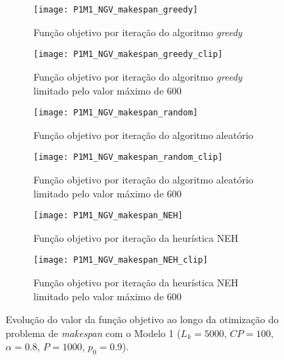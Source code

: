 \begin{figure}[H]
    \centering
    \begin{subfigure}{0.49\textwidth}
        \centering
        \texttt{[image: P1M1\_NGV\_makespan\_greedy]}
        \caption{Função objetivo por iteração do algoritmo \textit{greedy}}
        \label{fig:P1M1_NGV_makespan_greedy}
    \end{subfigure}
    \hfill
    \begin{subfigure}{0.49\textwidth}
        \centering
        \texttt{[image: P1M1\_NGV\_makespan\_greedy\_clip]}
        \caption{Função objetivo por iteração do algoritmo \textit{greedy} limitado pelo valor máximo de 600}
        \label{fig:P1M1_NGV_makespan_greedy_clip}
    \end{subfigure}
    
    \begin{subfigure}{0.49\textwidth}
        \centering
        \texttt{[image: P1M1\_NGV\_makespan\_random]}
        \caption{Função objetivo por iteração do algoritmo aleatório}
        \label{fig:P1M1_NGV_makespan_random}
    \end{subfigure}
    \hfill
    \begin{subfigure}{0.49\textwidth}
        \centering
        \texttt{[image: P1M1\_NGV\_makespan\_random\_clip]}
        \caption{Função objetivo por iteração do algoritmo aleatório limitado pelo valor máximo de 600}
        \label{fig:P1M1_NGV_makespan_random_clip}
    \end{subfigure}
    
    \begin{subfigure}{0.49\textwidth}
        \centering
        \texttt{[image: P1M1\_NGV\_makespan\_NEH]}
        \caption{Função objetivo por iteração da heurística NEH}
        \label{fig:P1M1_NGV_makespan_NEH}
    \end{subfigure}
    \hfill
    \begin{subfigure}{0.49\textwidth}
        \centering
        \texttt{[image: P1M1\_NGV\_makespan\_NEH\_clip]}
        \caption{Função objetivo por iteração da heurística NEH limitado pelo valor máximo de 600}
        \label{fig:P1M1_NGV_makespan_NEH_clip}
    \end{subfigure}
    \caption{Evolução do valor da função objetivo ao longo da otimização do problema de \textit{makespan} com o Modelo 1 ($L_{k}=5000$, $CP=100$, $\alpha=0.8$, $P=1000$, $p_{0}=0.9$).}
    \label{fig:P1M1_NGV_dif_sol_ini}
\end{figure}

